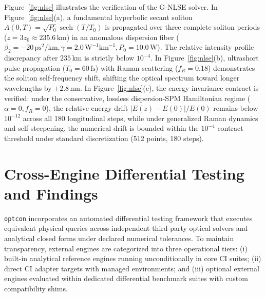 \documentclass[preprint,12pt]{elsarticle}
\begin{document}
Figure~\ref{fig:nlse} illustrates the verification of the G-NLSE solver. In Figure~\ref{fig:nlse}(a), a fundamental hyperbolic secant soliton $A(0, T) = \sqrt{P_0} \operatorname{sech}(T/T_0)$ is propagated over three complete soliton periods ($z = 3 z_0 \approx 235.6\,\mathrm{km}$) in an anomalous dispersion fiber ($\beta_2 = -20\,\mathrm{ps}^2/\mathrm{km}, \gamma = 2.0\,\mathrm{W}^{-1}\mathrm{km}^{-1}, P_0 = 10.0\,\mathrm{W}$). The relative intensity profile discrepancy after $235\,\mathrm{km}$ is strictly below $10^{-4}$. In Figure~\ref{fig:nlse}(b), ultrashort pulse propagation ($T_0 = 60\,\mathrm{fs}$) with Raman scattering ($f_R = 0.18$) demonstrates the soliton self-frequency shift, shifting the optical spectrum toward longer wavelengths by $+2.8\,\mathrm{nm}$. In Figure~\ref{fig:nlse}(c), the energy invariance contract is verified: under the conservative, lossless dispersion-SPM Hamiltonian regime ($\alpha = 0, f_R = 0$), the relative energy drift $|E(z) - E(0)|/E(0)$ remains below $10^{-12}$ across all 180 longitudinal steps, while under generalized Raman dynamics and self-steepening, the numerical drift is bounded within the $10^{-4}$ contract threshold under standard discretization (512 points, 180 steps).

\section{Cross-Engine Differential Testing and Findings}
\label{sec:differential}

\texttt{optcon} incorporates an automated differential testing framework that executes equivalent physical queries across independent third-party optical solvers and analytical closed forms under declared numerical tolerances. To maintain transparency, external engines are categorized into three operational tiers: (i) built-in analytical reference engines running unconditionally in core CI suites; (ii) direct CI adapter targets with managed environments; and (iii) optional external engines evaluated within dedicated differential benchmark suites with custom compatibility shims.
\end{document}
